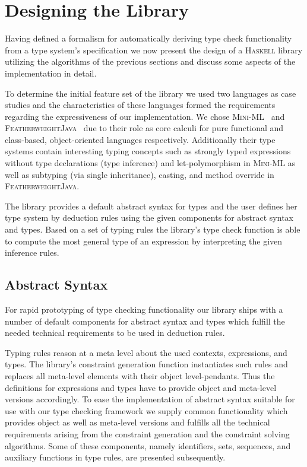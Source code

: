 \section{Designing the Library}

Having defined a formalism for automatically deriving type check
functionality from a type system's specification we now present the
design of a \textsc{Haskell} library utilizing the algorithms of the
previous sections and discuss some aspects of the implementation in
detail.

To determine the initial feature set of the library we used two
languages as case studies and the characteristics of these languages
formed the requirements regarding the expressiveness of our
implementation. We chose \textsc{Mini-ML}~\cite{MiniML86} and
\textsc{FeatherweightJava}~\cite{FJ01} due to their role as core
calculi for pure functional and class-based, object-oriented languages
respectively.  Additionally their type systems contain interesting
typing concepts such as strongly typed expressions without type
declarations (type inference) and let-polymorphism in \textsc{Mini-ML}
as well as subtyping (via single inheritance), casting, and method
override in \textsc{FeatherweightJava}.

The library provides a default abstract syntax for types and the user
defines her type system by deduction rules using the given components
for abstract syntax and types. Based on a set of typing rules the
library's type check function is able to compute the most general type
of an expression by interpreting the given inference rules.

\subsection{Abstract Syntax}

For rapid prototyping of type checking functionality our library ships
with a number of default components for abstract syntax and types
which fulfill the needed technical requirements to be used in
deduction rules.

Typing rules reason at a meta level about the used contexts,
expressions, and types. The library's constraint generation function
instantiates such rules and replaces all meta-level elements with
their object level-pendants. Thus the definitions for expressions and
types have to provide object and meta-level versions accordingly. To
ease the implementation of abstract syntax suitable for use with
our type checking framework we supply common functionality which
provides object as well as meta-level versions and fulfills all the
technical requirements arising from the constraint generation and the
constraint solving algorithms. Some of these components, namely
identifiers, sets, sequences, and auxiliary functions in type rules,
are presented subsequently.

